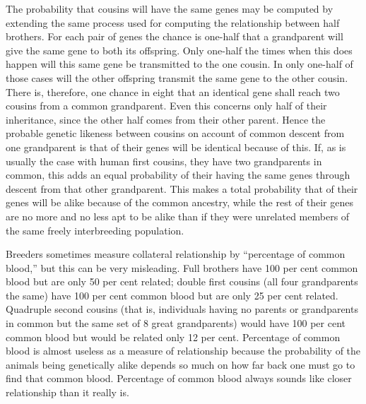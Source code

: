 The probability that cousins will have the same genes may be computed
by extending the same process used for computing the relationship
between half brothers. For each pair of genes the chance is one-half
that a grandparent will give the same gene to both its offspring. Only
one-half the times when this does happen will this same gene be transmitted
to the one cousin. In only one-half of those cases will the other
offspring transmit the same gene to the other cousin. There is, therefore,
one chance in eight that an identical gene shall reach two cousins
from a common grandparent. Even this concerns only half of their
inheritance, since the other half comes from their other parent. Hence
the probable genetic likeness between cousins on account of common
descent from one grandparent is that  of their genes will be identical
because of this. If, as is usually the case with human first cousins,
they have two grandparents in common, this adds an equal probability
of their having the same genes through descent from that other grandparent.
This makes a total probability that  of their genes will be
alike because of the common ancestry, while the rest of their genes are
no more and no less apt to be alike than if they were unrelated members
of the same freely interbreeding population.

Breeders sometimes measure collateral relationship by ``percentage
of common blood,'' but this can be very misleading. Full brothers have
100 per cent common blood but are only 50 per cent related; double
first cousins (all four grandparents the same) have 100 per cent common
blood but are only 25 per cent related. Quadruple second cousins (that
is, individuals having no parents or grandparents in common but the
same set of 8 great grandparents) would have 100 per cent common
blood but would be related only 12 per cent. Percentage of common
blood is almost useless as a measure of relationship because the probability
of the animals being genetically alike depends so much on how
far back one must go to find that common blood. Percentage of common
blood always sounds like closer relationship than it really is.

